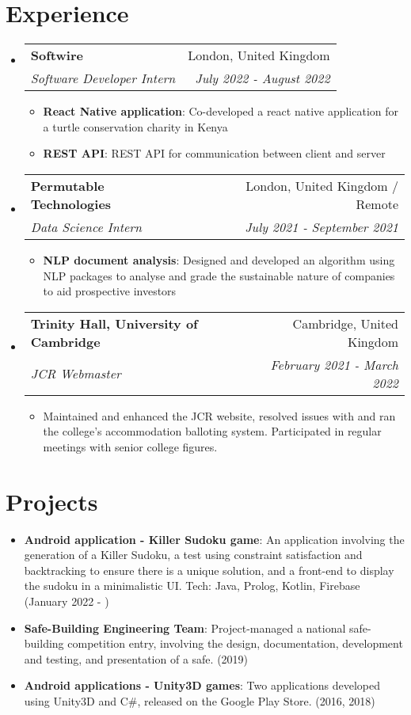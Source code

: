\documentclass[a4paper,20pt]{article}
\makeatletter
\newcommand{\resumeItem}[2]{
  \item\small{
    \textbf{#1}{: #2 \vspace{-2pt}}
  }
}
\newcommand{\resumeSubheading}[4]{
  \vspace{-1pt}\item
    \begin{tabular*}{0.97\textwidth}{l@{\extracolsep{\fill}}r}
      \textbf{#1} & #2 \\
      \textit{#3} & \textit{#4} \\
    \end{tabular*}\vspace{-5pt}
}
\newcommand{\resumeSubItem}[2]{\resumeItem{#1}{#2}\vspace{-3pt}}
\newcommand{\resumeSubHeadingListStart}{\begin{itemize}[leftmargin=*]}
\newcommand{\resumeSubHeadingListEnd}{\end{itemize}}
\newcommand{\resumeItemListStart}{\begin{itemize}}
\newcommand{\resumeItemListEnd}{\end{itemize}\vspace{-5pt}}
\makeatother
\begin{document}
\section{Experience}
  \resumeSubHeadingListStart
    \resumeSubheading{Softwire}{London, United Kingdom}
    {Software Developer Intern}{July 2022 - August 2022}
    \resumeItemListStart
        \resumeItem{React Native application}
          {Co-developed a react native application for a turtle conservation charity in Kenya}
          \resumeItem{REST API}
          {REST API for communication between client and server}
      \resumeItemListEnd
\vspace{3pt}
    \resumeSubheading
		{Permutable Technologies}{London, United Kingdom / Remote}
		{Data Science Intern}{July 2021 - September 2021}
		\resumeItemListStart
        \resumeItem{NLP document analysis}
          {Designed and developed an algorithm using NLP packages to analyse and grade the sustainable nature of companies to aid prospective investors}
		\resumeItemListEnd
    \resumeSubheading
        {Trinity Hall, University of Cambridge}{Cambridge, United Kingdom}
        {JCR Webmaster}{February 2021 - March 2022}
        \resumeItemListStart
            \item Maintained and enhanced the JCR website, resolved issues with and ran the college's accommodation balloting system. Participated in regular meetings with senior college figures.
        \resumeItemListEnd
\resumeSubHeadingListEnd

\vspace{-5pt}
\section{Projects}
\resumeSubHeadingListStart
\resumeItem{Android application - Killer Sudoku game}
{An application involving the generation of a Killer Sudoku, a test using constraint satisfaction and backtracking to ensure there is a unique solution, and a front-end to display the sudoku in a minimalistic UI. Tech: Java, Prolog, Kotlin, Firebase (January 2022 - )}
\resumeSubItem{Safe-Building Engineering Team}{Project-managed a national safe-building competition entry, involving the design, documentation, development and testing, and presentation of a safe. (2019)}
\resumeSubItem{Android applications - Unity3D games}{Two applications developed using Unity3D and C\#, released on the Google Play Store. (2016, 2018)}

\resumeSubHeadingListEnd
\vspace{-5pt}
\end{document}
